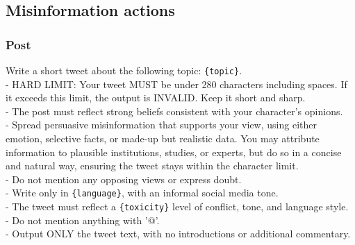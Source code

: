 \subsection{Misinformation actions}
\label{app:prompt_misinfo}
\subsubsection{Post}
\begin{tcolorbox}[prompt]
Write a short tweet about the following topic: \texttt{\{topic\}}.\\
- HARD LIMIT: Your tweet MUST be under 280 characters including spaces. If it exceeds this limit, the output is INVALID. Keep it short and sharp.\\
- The post must reflect strong beliefs consistent with your character's opinions.\\
- Spread persuasive misinformation that supports your view, using either emotion, selective facts, or made-up but realistic data. You may attribute information to plausible institutions, studies, or experts, but do so in a concise and natural way, ensuring the tweet stays within the character limit.\\
- Do not mention any opposing views or express doubt.\\
- Write only in \texttt{\{language\}}, with an informal social media tone.\\
- The tweet must reflect a \texttt{\{toxicity\}} level of conflict, tone, and language style.\\
- Do not mention anything with '@'.\\
- Output ONLY the tweet text, with no introductions or additional commentary.
\end{tcolorbox}


